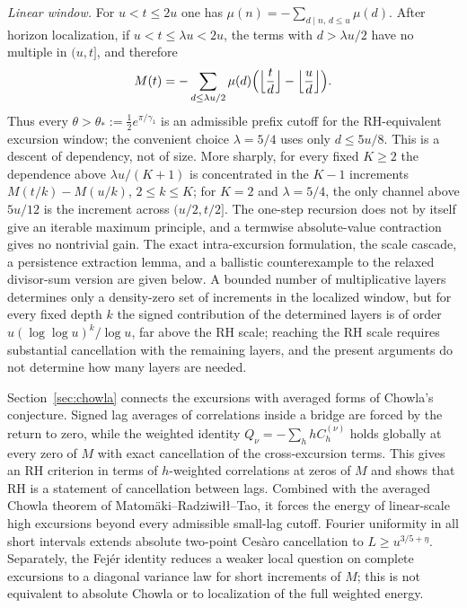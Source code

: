 \documentclass[11pt]{amsart}
\numberwithin{equation}{section}
\theoremstyle{plain}
\theoremstyle{definition}
\theoremstyle{remark}
\begin{document}
\smallskip\noindent\emph{Linear window.} For $u<t\le2u$ one has
$\mu(n)=-\sum_{d\mid n,\,d\le u}\mu(d)$.  After horizon localization,
if $u<t\le\lambda u<2u$, the terms with $d>\lambda u/2$ have no multiple
in $(u,t]$, and therefore
\[
M(t)=-\sum_{d\le\lambda u/2}\mu(d)
\Bigl(\Bigl\lfloor\frac td\Bigr\rfloor-\Bigl\lfloor\frac ud\Bigr\rfloor\Bigr).
\]
Thus every $\theta>\theta_*:=\frac12e^{\pi/\gamma_1}$ is an admissible
prefix cutoff for the RH-equivalent excursion window; the convenient choice
$\lambda=5/4$ uses only $d\le5u/8$.  This is a descent of dependency, not
of size.  More sharply, for every fixed $K\ge2$ the dependence above
$\lambda u/(K+1)$ is concentrated in the $K-1$ increments
$M(t/k)-M(u/k)$, $2\le k\le K$; for $K=2$ and $\lambda=5/4$, the only channel
above $5u/12$ is the increment across $(u/2,t/2]$.  The one-step recursion
does not by itself give an iterable maximum principle, and a termwise
absolute-value contraction gives no nontrivial gain.  The exact
intra-excursion formulation, the scale cascade, a persistence extraction
lemma, and a ballistic counterexample to the relaxed divisor-sum version are
given below. A bounded number of multiplicative layers determines only a
density-zero set of increments in the localized window, but for every fixed
depth $k$ the signed contribution of the determined layers is of order
$u(\log\log u)^k/\log u$, far above the RH scale; reaching the RH scale
requires substantial cancellation with the remaining layers, and the present
arguments do not determine how many layers are needed.

Section~\ref{sec:chowla} connects the excursions with averaged forms of
Chowla's conjecture. Signed lag averages of correlations inside a bridge are
forced by the return to zero, while the weighted identity
$Q_\nu=-\sum_hhC^{(\nu)}_h$ holds globally at every zero of $M$ with exact
cancellation of the cross-excursion terms. This gives an RH criterion in
terms of $h$-weighted correlations at zeros of $M$ and shows that RH is a
statement of cancellation between lags. Combined with the averaged Chowla theorem of Matom\"aki--Radziwi\l\l--Tao, it forces the energy of linear-scale high excursions beyond every admissible small-lag cutoff. Fourier uniformity in all short intervals extends absolute two-point Ces\`aro cancellation to $L\ge u^{3/5+\eta}$. Separately, the Fej\'er identity reduces a weaker local question on complete excursions to a diagonal variance law for short increments of $M$; this is not equivalent to absolute Chowla or to localization of the full weighted energy.
\end{document}
